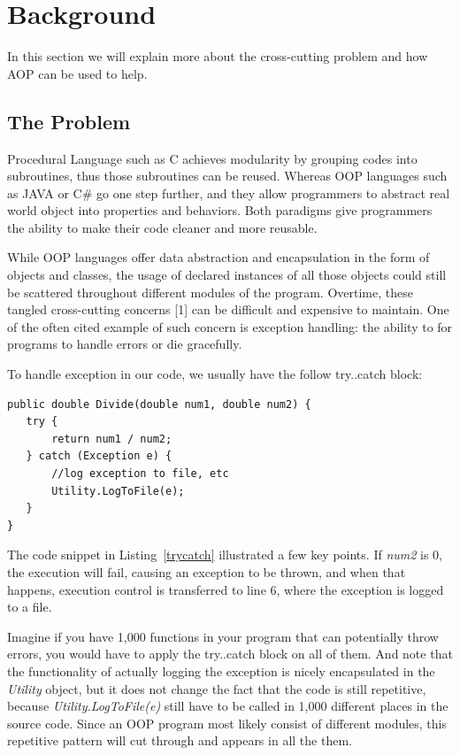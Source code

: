 \section{Background}
In this section we will explain more about the cross-cutting problem and how AOP can be used to help.

\subsection{The Problem}
Procedural Language such as C achieves modularity by grouping codes into subroutines, thus those subroutines can be reused. Whereas OOP languages such as JAVA or C\# go one step further, and they allow programmers to abstract real world object into properties and behaviors. Both paradigms give programmers the ability to make their code cleaner and more reusable.

While OOP languages offer data abstraction and encapsulation in the form of objects and classes, the usage of declared instances of all those objects could still be scattered throughout different modules of the program. Overtime, these tangled cross-cutting concerns [1] can be difficult and expensive to maintain. One of the often cited example of such concern is exception handling: the ability to for programs to handle errors or die gracefully.

To handle exception in our code, we usually have the follow try..catch block:

\begin{lstlisting}[caption={try..catch pattern}, label=trycatch]
public double Divide(double num1, double num2) {
   try {
       return num1 / num2;
   } catch (Exception e) {
       //log exception to file, etc
       Utility.LogToFile(e);
   }
}
\end{lstlisting}

The code snippet in Listing~\ref{trycatch} illustrated a few key points. If {\em num2} is 0, the execution will fail, causing an exception to be thrown, and when that happens, execution control is transferred to line 6, where the exception is logged to a file. 

Imagine if you have 1,000 functions in your program that can potentially throw errors, you would have to apply the try..catch block on all of them. And note that the functionality of actually logging the exception is nicely encapsulated in the {\em Utility} object, but it does not change the fact that the code is still repetitive, because {\em Utility.LogToFile(e)} still have to be called in 1,000 different places in the source code. Since an OOP program most likely consist of different modules, this repetitive pattern will cut through and appears in all the them.

